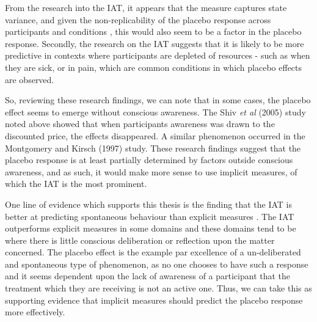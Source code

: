 From the research into the IAT, it appears that the measure captures state variance, and given the non-replicability of the placebo response across participants and conditions \cite{Whalley2008,Shapiro1997}, this would also seem to be a factor in the placebo response. Secondly, the research on the IAT suggests that it is likely to be more predictive in contexts where participants are depleted of resources - such as when they are sick, or in pain, which are common conditions in which placebo effects are observed. 



So, reviewing these research findings, we can note that in some cases, the placebo effect seems to emerge without conscious awareness. The Shiv \textit{et al} (2005) study noted above showed that when participants awareness was drawn to the discounted price, the effects disappeared. A similar phenomenon occurred in the Montgomery and Kirsch (1997) \cite{Montgomery1997} study. These research findings suggest that the placebo response is at least partially determined by factors outside conscious awareness, and as such, it would make more sense to use implicit measures, of which the IAT is the most prominent. 



One line of evidence which supports this thesis is the finding that the IAT is better at predicting spontaneous behaviour than explicit measures \cite{Conner2005,Hofmann2005}. The IAT outperforms explicit measures in some domains \cite{Greenwald2009} and these domains tend to be where there is little conscious deliberation or reflection upon the matter concerned. The placebo effect is the example par excellence of a un-deliberated and spontaneous  type of phenomenon, as no one chooses to have such a response and it seems dependent upon the lack of awareness of a participant that the treatment which they are receiving is not an active one. Thus, we can take this as supporting evidence that implicit measures should predict the placebo response more effectively. 

